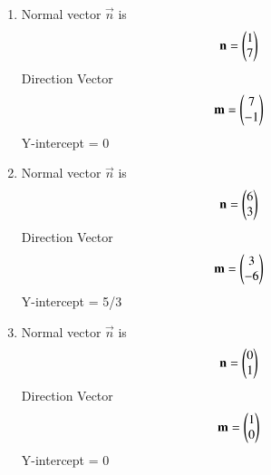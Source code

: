 \begin{enumerate}
\item Normal vector $\vec{n}$ is   \begin{align}
	\mathbf{n} = \begin{pmatrix} 1 \\ 7 \end{pmatrix}
\end{align}
Direction Vector
\begin{align}
		\mathbf{m} = \begin{pmatrix} 7 \\ -1 \end{pmatrix} 
\end {align}
Y-intercept = 0
\item Normal vector $\vec{n}$ is \begin{align}
	\mathbf{n} = \begin{pmatrix} 6 \\ 3 \end{pmatrix}
\end{align}
Direction Vector
\begin{align}
		\mathbf{m} = \begin{pmatrix} 3 \\ -6 \end{pmatrix}
\end{align} 	
Y-intercept = 5/3
\item Normal vector $\vec{n}$ is  \begin{align}
	\mathbf{n} = \begin{pmatrix} 0 \\ 1 \end{pmatrix}
\end{align} 
Direction Vector
\begin{align}
		\mathbf{m} = \begin{pmatrix} 1 \\ 0 \end{pmatrix}
\end{align}
Y-intercept =  0
\end{enumerate}
